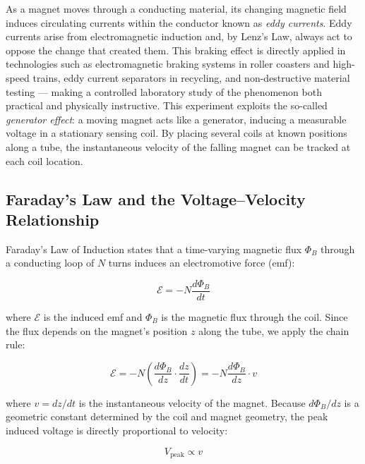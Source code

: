 \documentclass[11pt]{article}
\begin{document}
As a magnet moves through a conducting material, its changing magnetic field induces
circulating currents within the conductor known as \textit{eddy currents}. Eddy currents arise
from electromagnetic induction and, by Lenz's Law, always act to oppose the change that created
them. This braking effect is directly applied in technologies such as electromagnetic braking
systems in roller coasters and high-speed trains, eddy current separators in recycling, and
non-destructive material testing --- making a controlled laboratory study of the phenomenon
both practical and physically instructive. This experiment exploits the so-called
\textit{generator effect}: a moving magnet acts like a generator, inducing a measurable voltage
in a stationary sensing coil. By placing several coils at known positions along a tube, the
instantaneous velocity of the falling magnet can be tracked at each coil location.

\subsection*{Faraday's Law and the Voltage--Velocity Relationship}

Faraday's Law of Induction states that a time-varying magnetic flux $\Phi_B$ through a
conducting loop of $N$ turns induces an electromotive force (emf):

\begin{equation}
    \mathcal{E} = -N\frac{d\Phi_B}{dt}
    \label{eq:faraday}
\end{equation}

\noindent where $\mathcal{E}$ is the induced emf and $\Phi_B$ is the magnetic flux through the
coil. Since the flux depends on the magnet's position $z$ along the tube, we apply the chain rule:

\begin{equation}
    \mathcal{E} = -N\left(\frac{d\Phi_B}{dz} \cdot \frac{dz}{dt}\right) = -N\frac{d\Phi_B}{dz}\cdot v
    \label{eq:faraday_chain}
\end{equation}

\noindent where $v = dz/dt$ is the instantaneous velocity of the magnet. Because
$d\Phi_B/dz$ is a geometric constant determined by the coil and magnet geometry, the peak
induced voltage is directly proportional to velocity:

\begin{equation}
    V_\text{peak} \propto v
    \label{eq:vpeak}
\end{equation}
\end{document}
